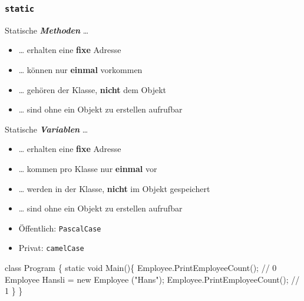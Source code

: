 \documentclass[
  9pt,
  a4paperpaper,
  DIV=11]{scrartcl}
\newenvironment{Shaded}{}{}
\newcommand{\CommentTok}[1]{\textcolor[rgb]{0.42,0.45,0.49}{#1}}
\newcommand{\DataTypeTok}[1]{\textcolor[rgb]{0.84,0.23,0.29}{#1}}
\newcommand{\FunctionTok}[1]{\textcolor[rgb]{0.44,0.26,0.76}{#1}}
\newcommand{\KeywordTok}[1]{\textcolor[rgb]{0.84,0.23,0.29}{#1}}
\newcommand{\NormalTok}[1]{\textcolor[rgb]{0.14,0.16,0.18}{#1}}
\newcommand{\OperatorTok}[1]{\textcolor[rgb]{0.14,0.16,0.18}{#1}}
\newcommand{\StringTok}[1]{\textcolor[rgb]{0.01,0.18,0.38}{#1}}
\providecommand{\tightlist}{%
  \setlength{\itemsep}{0pt}\setlength{\parskip}{0pt}}\usepackage{longtable,booktabs,array}
\numberwithin{equation}{section}
\begin{document}
\begin{multicols}{2}
\hypertarget{static}{%
\subsubsection{\texorpdfstring{\texttt{static}}{static}}\label{static}}

Statische \textbf{\emph{Methoden}} \ldots{}

\begin{itemize}
\tightlist
\item
  \ldots{} erhalten eine \textbf{fixe} Adresse
\item
  \ldots{} können nur \textbf{einmal} vorkommen
\item
  \ldots{} gehören der Klasse, \textbf{nicht} dem Objekt
\item
  \ldots{} sind ohne ein Objekt zu erstellen aufrufbar
\end{itemize}

Statische \textbf{\emph{Variablen}} \ldots{}

\begin{itemize}
\tightlist
\item
  \ldots{} erhalten eine \textbf{fixe} Adresse
\item
  \ldots{} kommen pro Klasse nur \textbf{einmal} vor
\item
  \ldots{} werden in der Klasse, \textbf{nicht} im Objekt gespeichert
\item
  \ldots{} sind ohne ein Objekt zu erstellen aufrufbar
\end{itemize}

\begin{tcolorbox}[enhanced jigsaw, colbacktitle=quarto-callout-caution-color!10!white, colback=white, rightrule=.15mm, title=\textcolor{quarto-callout-caution-color}{\faFire}\hspace{0.5em}{Namensgebung statischer Variablen}, opacityback=0, arc=.35mm, coltitle=black, opacitybacktitle=0.6, breakable, bottomtitle=1mm, toptitle=1mm, colframe=quarto-callout-caution-color-frame, bottomrule=.15mm, titlerule=0mm, left=2mm, leftrule=.75mm, toprule=.15mm]

\begin{itemize}
\tightlist
\item
  Öffentlich: \texttt{PascalCase}
\item
  Privat: \texttt{camelCase}
\end{itemize}

\end{tcolorbox}

\begin{Shaded}
\begin{Highlighting}[]
\KeywordTok{class}\NormalTok{ Program }\OperatorTok{\{}
  \KeywordTok{static} \DataTypeTok{void} \FunctionTok{Main}\OperatorTok{()\{}
\NormalTok{    Employee}\OperatorTok{.}\FunctionTok{PrintEmployeeCount}\OperatorTok{();}  \CommentTok{// 0}
\NormalTok{    Employee Hansli }\OperatorTok{=} \KeywordTok{new} \FunctionTok{Employee} \OperatorTok{(}\StringTok{"Hans"}\OperatorTok{);}
\NormalTok{    Employee}\OperatorTok{.}\FunctionTok{PrintEmployeeCount}\OperatorTok{();}  \CommentTok{// 1}
  \OperatorTok{\}}
\OperatorTok{\}}


\end{Highlighting}
\end{Shaded}
\end{multicols}
\end{document}
